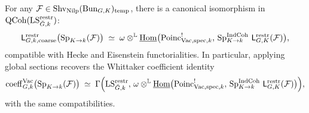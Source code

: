 \begin{theorem}\label{thm:spectral-specialization}
For any $\mathcal F\in\mathrm{Shv}_{\mathrm{Nilp}}(\mathrm{Bun}_{G,K})_{\mathrm{temp}}$, there is a canonical isomorphism in $\mathrm{QCoh}(\mathrm{LS}^{\mathrm{restr}}_{\breve G,k})$:
\[
\mathsf L^{\mathrm{restr}}_{G,k,\mathrm{coarse}}\bigl(\operatorname{Sp}_{K\to k}(\mathcal F)\bigr)
\;\simeq\;
\omega\otimes^{\mathbb L}\underline{\operatorname{Hom}}\bigl(\mathrm{Poinc}^{!}_{\mathrm{Vac},\mathrm{spec},k},\,\operatorname{Sp}^{\mathrm{IndCoh}}_{K\to k}\,\mathsf L^{\mathrm{restr}}_{G,K}(\mathcal F)\bigr),
\]
compatible with Hecke and Eisenstein functorialities. In particular, applying global sections recovers the Whittaker coefficient identity
\[
\mathrm{coeff}^{\mathrm{Vac}}_{G,k}\bigl(\operatorname{Sp}_{K\to k}(\mathcal F)\bigr)\;\simeq\;\Gamma\Bigl(\mathrm{LS}^{\mathrm{restr}}_{\breve G,k},\,\omega\otimes^{\mathbb L}\underline{\operatorname{Hom}}\bigl(\mathrm{Poinc}^{!}_{\mathrm{Vac},\mathrm{spec},k},\,\operatorname{Sp}^{\mathrm{IndCoh}}_{K\to k}\,\mathsf L^{\mathrm{restr}}_{G,K}(\mathcal F)\bigr)\Bigr),
\]
with the same compatibilities.
\end{theorem}

